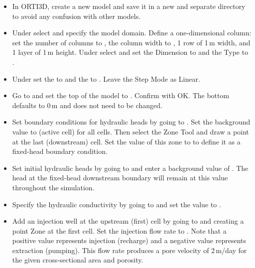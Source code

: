 \begin{itemize}

\item In ORTI3D, create a new model and save it in a new and separate
  directory to avoid any confusion with other models.

\item Under  select  and
  specify the model domain.  Define a one-dimensional column: set the
  number of columns to , the column width to , 1 row
  of 1\,m width, and 1 layer of 1\,m height.  Under
   select  and set the
  Dimension to  and the Type to .

\item Under  set the  to  and the  to
  .  Leave the Step Mode as Linear.

\item Go to  and set the top of the
  model to .  Confirm with OK\@.  The bottom defaults to 0\,m
  and does not need to be changed.

\item Set boundary conditions for hydraulic heads by going to
  .  Set the background value to
   (active cell) for all cells.  Then select the Zone Tool and
  draw a point at the last (downstream) cell.  Set the value of this
  zone to  to define it as a fixed-head boundary condition.

\item Set initial hydraulic heads by going to  and enter a background value of .  The head at the
  fixed-head downstream boundary will remain at this value throughout
  the simulation.

\item Specify the hydraulic conductivity by going to  and set the value to
  .

\item Add an injection well at the upstream (first) cell by going to
   and
  creating a point Zone at the first cell.  Set the injection flow rate
  to .  Note that a positive value represents
  injection (recharge) and a negative value represents extraction
  (pumping).  This flow rate produces a pore velocity of 2\,m/day for
  the given cross-sectional area and porosity.

\end{itemize}

